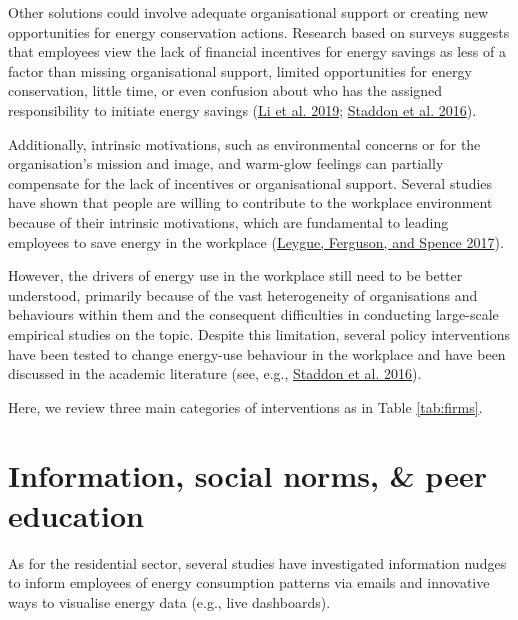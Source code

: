 \documentclass[
  11pt,
  captions=heading]{scrreport}
\begin{document}
Other solutions could involve adequate organisational support or
creating new opportunities for energy conservation actions. Research
based on surveys suggests that employees view the lack of financial
incentives for energy savings as less of a factor than missing
organisational support, limited opportunities for energy conservation,
little time, or even confusion about who has the assigned responsibility
to initiate energy savings
(\protect\hyperlink{ref-li2019understanding}{Li et al. 2019};
\protect\hyperlink{ref-staddon2016intervening}{Staddon et al. 2016}).

Additionally, intrinsic motivations, such as environmental concerns or
for the organisation's mission and image, and warm-glow feelings can
partially compensate for the lack of incentives or organisational
support. Several studies have shown that people are willing to
contribute to the workplace environment because of their intrinsic
motivations, which are fundamental to leading employees to save energy
in the workplace (\protect\hyperlink{ref-leygue2017saving}{Leygue,
Ferguson, and Spence 2017}).

However, the drivers of energy use in the workplace still need to be
better understood, primarily because of the vast heterogeneity of
organisations and behaviours within them and the consequent difficulties
in conducting large-scale empirical studies on the topic. Despite this
limitation, several policy interventions have been tested to change
energy-use behaviour in the workplace and have been discussed in the
academic literature (see, e.g.,
\protect\hyperlink{ref-staddon2016intervening}{Staddon et al. 2016}).

Here, we review three main categories of interventions as in Table
\ref{tab:firms}.

\hypertarget{information-social-norms-peer-education}{%
\section{Information, social norms, \& peer
education}\label{information-social-norms-peer-education}}

As for the residential sector, several studies have investigated
information nudges to inform employees of energy consumption patterns
via emails and innovative ways to visualise energy data (e.g., live
dashboards).
\end{document}
